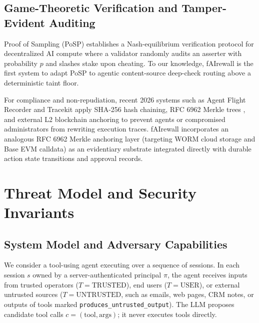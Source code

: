 \documentclass[conference]{IEEEtran}
\begin{document}
\subsection{Game-Theoretic Verification and Tamper-Evident Auditing}
Proof of Sampling (PoSP) \cite{zhang2024posp} establishes a Nash-equilibrium verification protocol for decentralized AI compute where a validator randomly audits an asserter with probability $p$ and slashes stake upon cheating. To our knowledge, fAIrewall is the first system to adapt PoSP to agentic content-source deep-check routing above a deterministic taint floor.

For compliance and non-repudiation, recent 2026 systems such as Agent Flight Recorder \cite{bindschaedler2026flightrecorder} and Tracekit \cite{ghosh2026tracekit} apply SHA-256 hash chaining, RFC 6962 Merkle trees \cite{laurie2013rfc6962}, and external L2 blockchain anchoring to prevent agents or compromised administrators from rewriting execution traces. fAIrewall incorporates an analogous RFC 6962 Merkle anchoring layer (targeting WORM cloud storage and Base EVM calldata) as an evidentiary substrate integrated directly with durable action state transitions and approval records.

\section{Threat Model and Security Invariants}

\subsection{System Model and Adversary Capabilities}
We consider a tool-using agent executing over a sequence of sessions. In each session $s$ owned by a server-authenticated principal $\pi$, the agent receives inputs from trusted operators ($T = \text{TRUSTED}$), end users ($T = \text{USER}$), or external untrusted sources ($T = \text{UNTRUSTED}$, such as emails, web pages, CRM notes, or outputs of tools marked \texttt{produces\_untrusted\_output}). The LLM proposes candidate tool calls $c = (\text{tool}, \text{args})$; it never executes tools directly.
\end{document}

